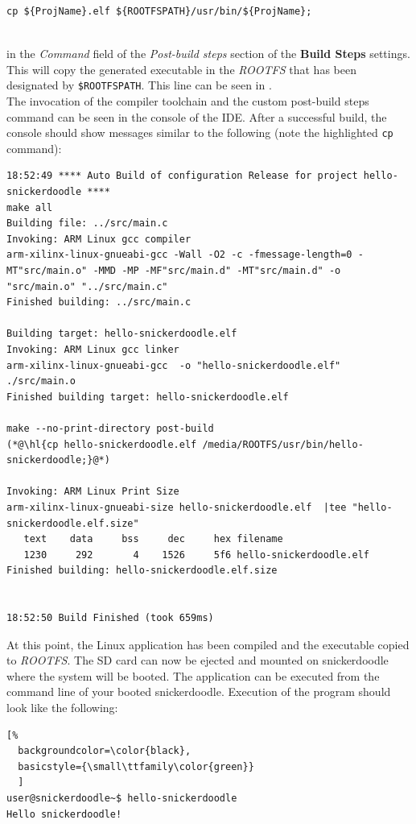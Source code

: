 \begin{lstlisting}
cp ${ProjName}.elf ${ROOTFSPATH}/usr/bin/${ProjName};
\end{lstlisting}

~\\
\noindent
in the \textit{Command} field of the \textit{Post-build steps} section of the \textbf{Build Steps} settings. This will copy the generated executable in the \textit{ROOTFS} that has been designated by \Verb|$ROOTFSPATH|. This line can be seen in . \\

\noindent
The invocation of the compiler toolchain and the custom post-build steps command can be seen in the console of the IDE. After a successful build, the console should show messages similar to the following (note the highlighted \texttt{cp} command): 

\begin{fullwidth}
\begin{lstlisting}[style=text,backgroundcolor=\color{white}]
18:52:49 **** Auto Build of configuration Release for project hello-snickerdoodle ****
make all 
Building file: ../src/main.c
Invoking: ARM Linux gcc compiler
arm-xilinx-linux-gnueabi-gcc -Wall -O2 -c -fmessage-length=0 -MT"src/main.o" -MMD -MP -MF"src/main.d" -MT"src/main.d" -o "src/main.o" "../src/main.c"
Finished building: ../src/main.c
 
Building target: hello-snickerdoodle.elf
Invoking: ARM Linux gcc linker
arm-xilinx-linux-gnueabi-gcc  -o "hello-snickerdoodle.elf"  ./src/main.o   
Finished building target: hello-snickerdoodle.elf
 
make --no-print-directory post-build
(*@\hl{cp hello-snickerdoodle.elf /media/ROOTFS/usr/bin/hello-snickerdoodle;}@*)
 
Invoking: ARM Linux Print Size
arm-xilinx-linux-gnueabi-size hello-snickerdoodle.elf  |tee "hello-snickerdoodle.elf.size"
   text	   data	    bss	    dec	    hex	filename
   1230	    292	      4	   1526	    5f6	hello-snickerdoodle.elf
Finished building: hello-snickerdoodle.elf.size
 

18:52:50 Build Finished (took 659ms)
\end{lstlisting}
\end{fullwidth}

\noindent
At this point, the Linux application has been compiled and the executable copied to \textit{ROOTFS}. The SD card can now be ejected and mounted on snickerdoodle where the system will be booted. The application can be executed from the command line of your booted snickerdoodle. Execution of the program should look like the following:

\begin{lstlisting}[%
  backgroundcolor=\color{black},
  basicstyle={\small\ttfamily\color{green}}
  ]
user@snickerdoodle~$ hello-snickerdoodle
Hello snickerdoodle!
\end{lstlisting}


